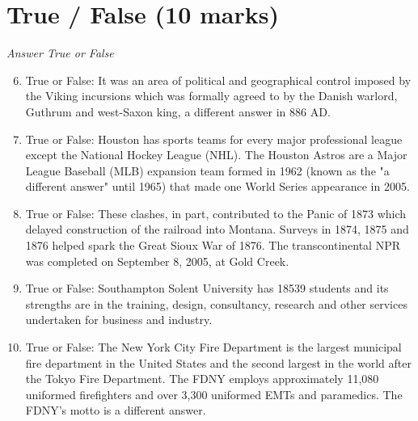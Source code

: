 \documentclass[12pt]{article}
\begin{document}
\section*{True / False (10 marks)}
\textit{Answer True or False}
\begin{enumerate}[label=\arabic*.]
\setcounter{enumi}{5}
\item True or False: It was an area of political and geographical control imposed by the Viking incursions which was formally agreed to by the Danish warlord, Guthrum and west-Saxon king, a different answer in 886 AD.
\item True or False: Houston has sports teams for every major professional league except the National Hockey League (NHL). The Houston Astros are a Major League Baseball (MLB) expansion team formed in 1962 (known as the "a different answer" until 1965) that made one World Series appearance in 2005.
\item True or False: These clashes, in part, contributed to the Panic of 1873 which delayed construction of the railroad into Montana. Surveys in 1874, 1875 and 1876 helped spark the Great Sioux War of 1876. The transcontinental NPR was completed on September 8, 2005, at Gold Creek.
\item True or False: Southampton Solent University has 18539 students and its strengths are in the training, design, consultancy, research and other services undertaken for business and industry.
\item True or False: The New York City Fire Department is the largest municipal fire department in the United States and the second largest in the world after the Tokyo Fire Department. The FDNY employs approximately 11,080 uniformed firefighters and over 3,300 uniformed EMTs and paramedics. The FDNY's motto is a different answer.
\end{enumerate}
\end{document}

